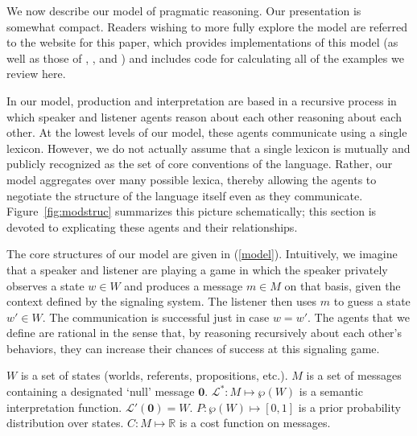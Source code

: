 \documentclass[12pt,twoside]{article}
\newcommand{\Figref}[1]{Figure~\ref{#1}}
\newcommand{\eg}[1]{(\ref{#1})}
\newcommand{\set}[1]{\ensuremath{\left\{ #1 \right\}}}
\newcommand{\Reals}{\mathbb{R}}
\newcommand{\States}{W}
\newcommand{\state}{w}
\newcommand{\Lex}{\mathcal{L}}
\newcommand{\LexStar}{\Lex^{\ast}}
\newcommand{\Messages}{M}
\newcommand{\msg}{m}
\newcommand{\Costs}{C}
\newcommand{\Prior}{P}
\newcommand{\nullmsg}{\mathbf{0}}
\renewcommand{\_}{\textbf{\textunderscore\hspace{-4pt}\textunderscore\hspace{-3pt}\textunderscore\hspace{-4pt}\textunderscore}\hspace{0.5pt}}			%
\begin{document}
We now describe our model of pragmatic reasoning. Our presentation is
somewhat compact. Readers wishing to more fully explore the model are
referred to the website for this paper, which provides implementations
of this model (as well as those of \citealt{Frank:Goodman:2012},
\citealt{bergen-levy-goodman:2014}, and
\citealt{Smith:Goodman:Frank:2013}) and includes code for calculating
all of the examples we review here.

In our model, production and interpretation are based in a recursive
process in which speaker and listener agents reason about each other
reasoning about each other.  At the lowest levels of our model, these
agents communicate using a single lexicon. However, we do not actually
assume that a single lexicon is mutually and publicly recognized as
the set of core conventions of the language. Rather, our model
aggregates over many possible lexica, thereby allowing the agents to
negotiate the structure of the language itself even as they
communicate. \Figref{fig:modstruc} summarizes this picture
schematically; this section is devoted to explicating these agents and
their relationships.

The core structures of our model are given in \eg{model}.
Intuitively, we imagine that a speaker and listener are playing a game
in which the speaker privately observes a state $\state \in \States$
and produces a message $\msg \in \Messages$ on that basis, given the
context defined by the signaling system. The listener then uses $\msg$
to guess a state $\state' \in \States$. The communication is
successful just in case $\state = \state'$. The agents that we define
are rational in the sense that, by reasoning recursively about each
other's behaviors, they can increase their chances of success at this
signaling game.
%
\begin{exe}
\ex\label{model}
  \begin{xlist}
  \ex\label{states}%
    $\States$ is a set of states (worlds, referents, propositions, etc.).
  \ex\label{messages}%
    $\Messages$ is a set of messages containing a designated `null' message $\nullmsg$.
  \ex\label{lex}%
    $\LexStar: \Messages \mapsto \wp(\States)$ is a semantic interpretation function. 
    $\Lex'(\nullmsg) = \States$.
  \ex\label{prior}%
    $\Prior : \wp(\States) \mapsto [0,1]$ is a prior probability
    distribution over states.    
  \ex\label{costs}%
    $\Costs : \Messages \mapsto \Reals$ is a cost function on messages.
  \end{xlist}
\end{exe}
\end{document}
